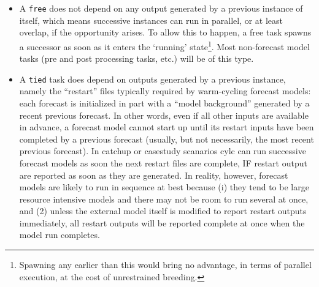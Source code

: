 \documentclass[11pt,a4paper]{article}
\begin{document}
\begin{itemize} \item A \lstinline=free= does not depend on any
        output generated by a previous instance of itself, which means
        successive instances can run in parallel, or at least overlap,
        if the opportunity arises. To allow this to happen, a free task
        spawns a successor as soon as it enters the `running'
        state\footnote{Spawning any earlier than this would bring no
        advantage, in terms of parallel execution, at the cost of
        unrestrained breeding.}. Most non-forecast model tasks (pre and
        post processing tasks, etc.) will be of this type.

    \item A \lstinline=tied= task does depend on outputs
        generated by a previous instance, namely the ``restart''
        files typically required by warm-cycling forecast models:
        each forecast is initialized in part with a ``model
        background'' generated by a recent previous forecast.
        In other words, even if all other inputs are available 
        in advance, a forecast model cannot start up until its
        restart inputs have been completed by a previous forecast
        (usually, but not necessarily, the most recent previous
        forecast). In catchup or casestudy scanarios cylc can run
        successive forecast models as soon the next restart files
        are complete, IF restart output are reported as soon as they are
        generated. In reality, however, forecast models are likely
        to run in sequence at best because (i) they tend to be large
        resource intensive models and there may not be room to run
        several at once, and (2) unless the external model itself 
        is modified to report restart outputs immediately, all 
        restart outputs will be reported complete at once when the
        model run completes.

\end{itemize}
\end{document}
